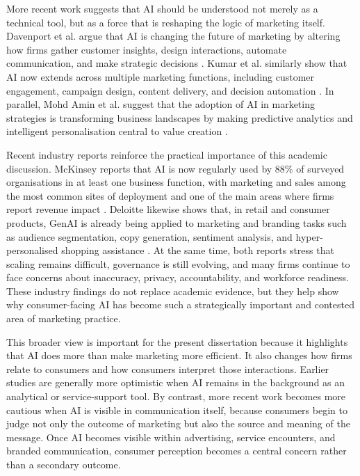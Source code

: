 More recent work suggests that AI should be understood not merely as a technical tool, but as a force that is reshaping the logic of marketing itself. Davenport et al. argue that AI is changing the future of marketing by altering how firms gather customer insights, design interactions, automate communication, and make strategic decisions \cite{davenport2020future}. Kumar et al. similarly show that AI now extends across multiple marketing functions, including customer engagement, campaign design, content delivery, and decision automation \cite{kumar2024aipowered}. In parallel, Mohd Amin et al. suggest that the adoption of AI in marketing strategies is transforming business landscapes by making predictive analytics and intelligent personalisation central to value creation \cite{mohdamin2025adoption}.

Recent industry reports reinforce the practical importance of this academic discussion. McKinsey reports that AI is now regularly used by 88\% of surveyed organisations in at least one business function, with marketing and sales among the most common sites of deployment and one of the main areas where firms report revenue impact \cite{mckinsey2025stateai}. Deloitte likewise shows that, in retail and consumer products, GenAI is already being applied to marketing and branding tasks such as audience segmentation, copy generation, sentiment analysis, and hyper-personalised shopping assistance \cite{deloitte2025retailgenai}. At the same time, both reports stress that scaling remains difficult, governance is still evolving, and many firms continue to face concerns about inaccuracy, privacy, accountability, and workforce readiness. These industry findings do not replace academic evidence, but they help show why consumer-facing AI has become such a strategically important and contested area of marketing practice.

This broader view is important for the present dissertation because it highlights that AI does more than make marketing more efficient. It also changes how firms relate to consumers and how consumers interpret those interactions. Earlier studies are generally more optimistic when AI remains in the background as an analytical or service-support tool. By contrast, more recent work becomes more cautious when AI is visible in communication itself, because consumers begin to judge not only the outcome of marketing but also the source and meaning of the message. Once AI becomes visible within advertising, service encounters, and branded communication, consumer perception becomes a central concern rather than a secondary outcome.

